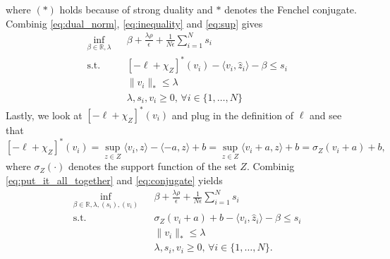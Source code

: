 \documentclass{scrartcl}
\newcommand{\R}{\mathbb{R}}
\begin{document}
where $(*)$ holds because of strong duality and $*$ denotes the Fenchel conjugate.
Combinig \eqref{eq:dual_norm}, \eqref{eq:inequality} and \eqref{eq:sup} gives
\begin{equation}
  \label{eq:put_it_all_together}
  \begin{aligned}
    & \inf_{\beta \in \R, \lambda} & & \beta + \frac{\lambda\rho}{\epsilon} + \frac{1}{N\epsilon} \sum_{i=1}^N s_i \\
    & \text{s.t.} & & [-\ell+ \chi_Z]^*(v_i) - \langle v_i, \hat{z}_i \rangle -\beta \le s_i \\
      & & & \lVert {v_i} \rVert_* \le \lambda \\
      & & & \lambda, s_i, v_i \geq 0, \, \forall i \in \{1,\dots,N\}  
  \end{aligned}
\end{equation}
Lastly, we look at $[-\ell+ \chi_Z]^*(v_i)$ and plug in the definition of $\ell$
and see that
\begin{equation}
  \label{eq:conjugate}
  [-\ell+ \chi_Z]^*(v_i) = \sup_{z \in Z} \langle {v_i,z} \rangle - \langle {-a, z} \rangle + b = \sup_{z \in Z} \langle {v_i + a, z} \rangle + b = \sigma_Z(v_i + a) + b,
\end{equation}
where $\sigma_Z(\cdot)$ denotes the support function of the set $Z$. Combinig
\eqref{eq:put_it_all_together} and \eqref{eq:conjugate} yields
\begin{equation}
  \label{eq:defin_of_loss}
  \begin{aligned}
    & \inf_{\beta \in \R, \lambda, (s_i), (v_i)} & & \beta + \frac{\lambda\rho}{\epsilon} + \frac{1}{N\epsilon} \sum_{i=1}^N s_i \\
    & \text{s.t.} & & \sigma_Z(v_i + a) + b - \langle v_i, \hat{z}_i \rangle -\beta \le s_i \\
     & & & \lVert {v_i} \rVert_* \le \lambda \\
     & & & \lambda, s_i, v_i \geq 0, \, \forall i \in \{1,\dots,N\}.  
  \end{aligned}
\end{equation}
\end{document}

